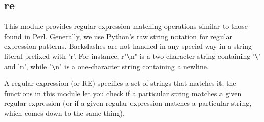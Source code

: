 \subsection{re}
This module provides regular expression matching operations similar to those found in Perl. Generally, we use Python’s raw string notation for regular expression patterns. Backslashes are not handled in any special way in a string literal prefixed with 'r'. For instance, r"\verb?\?n" is a two-character string containing '\verb?\?' and 'n', while "\verb?\?n" is a one-character string containing a newline.

A regular expression (or RE) specifies a set of strings that matches it; the functions in this module let you check if a particular string matches a given regular expression (or if a given regular expression matches a particular string, which comes down to the same thing).


